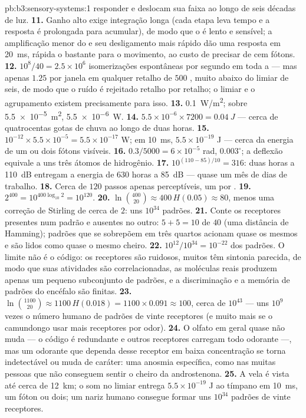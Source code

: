\begin{solution}{pb:b3:sensory-systems:1}
responder e deslocam sua faixa ao longo de seis décadas de luz.
\textbf{11.} Ganho alto exige integração longa (cada etapa leva tempo e a
resposta é prolongada para acumular), de modo que o  é lento e
sensível; a amplificação menor do  e seu desligamento mais rápido
dão uma resposta em \qty{20}{ms}, rápida o bastante para o movimento, ao
custo de precisar de cem fótons.
\textbf{12.} $10^{8}/40 = 2.5\times 10^{6}$ isomerizações espontâneas por
segundo em toda a  --- mas apenas $1.25$ por janela em qualquer
retalho de $500$ , muito abaixo do limiar de seis, de modo que
o ruído é rejeitado retalho por retalho; o limiar e o agrupamento
existem precisamente para isso.
\textbf{13.} \qty{0.1}{W/m^2}; sobre \qty{5.5e-5}{m^2},
\qty{5.5e-6}{W}.
\textbf{14.} $5.5\times 10^{-6}\times 7200 = \qty{0.04}{J}$ --- cerca de
quatrocentas gotas de chuva ao longo de duas horas.
\textbf{15.} $10^{-12}\times 5.5\times 10^{-5} = 5.5\times 10^{-17}$ W;
em \qty{10}{ms}, $5.5\times 10^{-19}$ J --- cerca da energia de um ou
dois fótons visíveis.
\textbf{16.} $0.3/5000 = 6\times 10^{-5}$ rad, $0.003^{\circ}$; a
deflexão equivale a uns três átomos de hidrogênio.
\textbf{17.} $10^{(110 - 85)/10} = 316$: duas horas a \qty{110}{dB}
entregam a energia de $630$ horas a \qty{85}{dB} --- quase um mês de
dias de trabalho.
\textbf{18.} Cerca de $120$ passos apenas perceptíveis, um por .
\textbf{19.} $2^{400} = 10^{400\log_{10}2} = 10^{120}$.
\textbf{20.} $\ln\binom{400}{20} \approx 400\,H(0.05) \approx 80$, menos
uma correção de Stirling de cerca de $2$: uns $10^{34}$ padrões.
\textbf{21.} Conte os receptores presentes num padrão e ausentes no
outro: $5 +
5 = 10$ de $40$ (uma distância de Hamming); padrões que se
sobrepõem em três quartos acionam quase os mesmos  e são
lidos como quase o mesmo cheiro.
\textbf{22.} $10^{12}/10^{34} = 10^{-22}$ dos padrões. O limite não é o
código: os receptores são ruidosos, muitos têm sintonia parecida, de
modo que suas atividades são correlacionadas, as moléculas reais
produzem apenas um pequeno subconjunto de padrões, e a discriminação e a
memória de padrões do encéfalo são finitas.
\textbf{23.} $\ln\binom{1100}{20} \approx 1100\,H(0.018) = 1100\times
0.091 \approx 100$, cerca de $10^{43}$ --- uns $10^{9}$ vezes o número
humano de padrões de vinte receptores (e muito mais se o camundongo usar
mais receptores por odor).
\textbf{24.} O olfato em geral quase não muda --- o código é redundante e
outros receptores carregam todo odorante ---, mas um odorante que
dependa desse receptor em baixa concentração se torna indetectável ou
muda de caráter: uma anosmia específica, como nas muitas pessoas que não
conseguem sentir o cheiro da androstenona.
\textbf{25.} A vela é vista até cerca de \qty{12}{km}; o som no limiar
entrega $5.5\times 10^{-19}$ J ao tímpano em \qty{10}{ms}, um fóton ou
dois; um nariz humano consegue formar uns $10^{34}$ padrões de vinte
receptores.
\end{solution}
